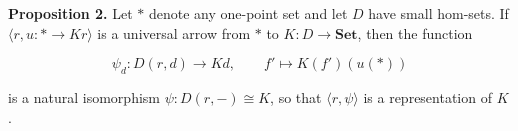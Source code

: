 \textbf{Proposition 2.} Let $*$ denote any one-point set and let $D$ have small hom-sets. If $\langle r, u: * \to Kr \rangle$ is a universal arrow from $*$ to $K: D \to \mathbf{Set}$, then the function

\[
\psi_d: D(r, d) \to Kd, \qquad f' \mapsto K(f')(u(*))
\]

is a natural isomorphism $\psi: D(r, -) \cong K$, so that $\langle r, \psi \rangle$ is a representation of $K$.
